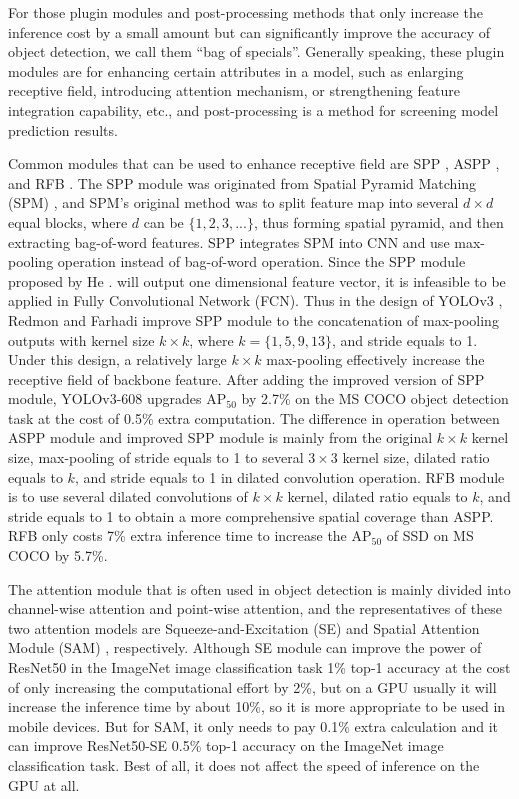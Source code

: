 \documentclass[10pt,twocolumn,letterpaper]{article}
\begin{document}
For those plugin modules and post-processing methods that only increase the inference cost by a small amount but can significantly improve the accuracy of object detection, we call them ``bag of specials''. Generally speaking, these plugin modules are for enhancing certain attributes in a model, such as enlarging receptive field, introducing attention mechanism, or strengthening feature integration capability, etc., and post-processing is a method for screening model prediction results.

Common modules that can be used to enhance receptive field are SPP \cite{he2015spatial}, ASPP \cite{chen2017deeplab}, and RFB \cite{liu2018receptive}. The SPP module was originated from Spatial Pyramid Matching (SPM) \cite{lazebnik2006beyond}, and SPM’s original method was to split feature map into several $d \times d$ equal blocks, where $d$ can be $\{1, 2, 3, ...\}$, thus forming spatial pyramid, and then extracting bag-of-word features. SPP integrates SPM into CNN and use max-pooling operation instead of bag-of-word operation. Since the SPP module proposed by He \etal. \cite{he2015spatial} will output one dimensional feature vector, it is infeasible to be applied in Fully Convolutional Network (FCN). Thus in the design of YOLOv3 \cite{redmon2018yolov3}, Redmon and Farhadi improve SPP module to the concatenation of max-pooling outputs with kernel size $k \times k$, where $k = \{1, 5, 9, 13\}$, and stride equals to 1. Under this design, a relatively large $k \times k$ max-pooling effectively increase the receptive field of backbone feature. After adding the improved version of SPP module, YOLOv3-608 upgrades AP$_{50}$ by 2.7\% on the MS COCO object detection task at the cost of 0.5\% extra computation. The difference in operation between ASPP \cite{chen2017deeplab} module and improved SPP module is mainly from the original $k \times k$ kernel size, max-pooling of stride equals to 1 to several $3 \times 3$ kernel size, dilated ratio equals to $k$, and stride equals to 1 in dilated convolution operation. RFB module is to use several dilated convolutions of $k \times k$ kernel, dilated ratio equals to $k$, and stride equals to 1 to obtain a more comprehensive spatial coverage than ASPP. RFB \cite{liu2018receptive} only costs 7\% extra inference time to increase the AP$_{50}$ of SSD on MS COCO by 5.7\%.

The attention module that is often used in object detection is mainly divided into channel-wise attention and point-wise attention, and the representatives of these two attention models are Squeeze-and-Excitation (SE) \cite{hu2018squeeze} and Spatial Attention Module (SAM) \cite{woo2018cbam}, respectively. Although SE module can improve the power of ResNet50 in the ImageNet image classification task 1\% top-1 accuracy at the cost of only increasing the computational effort by 2\%, but on a GPU usually it will increase the inference time by about 10\%, so it is more appropriate to be used in mobile devices. But for SAM, it only needs to pay 0.1\% extra calculation and it can improve ResNet50-SE 0.5\% top-1 accuracy on the ImageNet image classification task. Best of all, it does not affect the speed of inference on the GPU at all.
\end{document}
